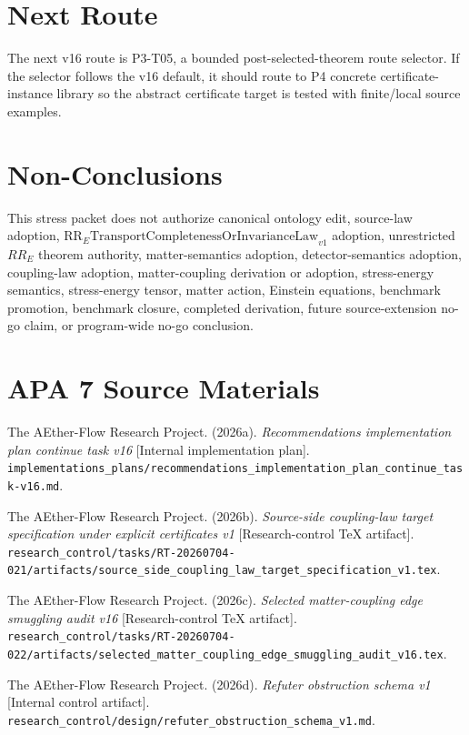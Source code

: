 \documentclass[11pt]{article}
\begin{document}
\section{Next Route}

The next v16 route is P3-T05, a bounded post-selected-theorem route selector.
If the selector follows the v16 default, it should route to P4 concrete
certificate-instance library so the abstract certificate target is tested with
finite/local source examples.

\section{Non-Conclusions}

This stress packet does not authorize canonical ontology edit, source-law
adoption, \(\mathrm{RR}_{E}\mathrm{TransportCompletenessOrInvarianceLaw}_{v1}\)
adoption, unrestricted \(RR_E\) theorem authority, matter-semantics adoption,
detector-semantics adoption, coupling-law adoption, matter-coupling derivation
or adoption, stress-energy semantics, stress-energy tensor, matter action,
Einstein equations, benchmark promotion, benchmark closure, completed
derivation, future source-extension no-go claim, or program-wide no-go
conclusion.

\section{APA 7 Source Materials}

The AEther-Flow Research Project. (2026a). \emph{Recommendations
implementation plan continue task v16} [Internal implementation plan].
\texttt{implementations\_plans/recommendations\_implementation\_plan\_continue\_task-v16.md}.

The AEther-Flow Research Project. (2026b). \emph{Source-side coupling-law
target specification under explicit certificates v1} [Research-control TeX
artifact].
\texttt{research\_control/tasks/RT-20260704-021/artifacts/source\_side\_coupling\_law\_target\_specification\_v1.tex}.

The AEther-Flow Research Project. (2026c). \emph{Selected matter-coupling edge
smuggling audit v16} [Research-control TeX artifact].
\texttt{research\_control/tasks/RT-20260704-022/artifacts/selected\_matter\_coupling\_edge\_smuggling\_audit\_v16.tex}.

The AEther-Flow Research Project. (2026d). \emph{Refuter obstruction schema
v1} [Internal control artifact].
\texttt{research\_control/design/refuter\_obstruction\_schema\_v1.md}.
\end{document}
